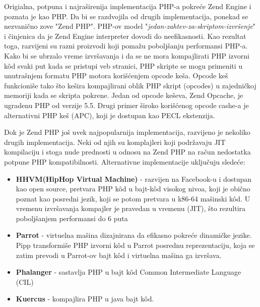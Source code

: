\documentclass[a4paper]{article}
\begin{document}
{Origialna, potpuna i najraširenija implementacija PHP-a pokreće Zend Engine i poznata je kao PHP. Da bi se razdvojila od drugih implementacija, ponekad se nezvanično zove "Zend PHP". PHP-ov model "\textit{jedan-zahtev-za-skriptom-izvršenje}" i činjenica da je Zend Engine interpreter dovodi do neefikasnosti. Kao rezultat toga, razvijeni su razni proizvodi koji pomažu poboljšanju performansi PHP-a. Kako bi se ubrzalo vreme izvršavanja i da se ne mora kompajlirati PHP izvorni k\^{o}d svaki put kada se pristupi veb stranici, PHP skripte se mogu primeniti u unutrašnjem formatu PHP motora korišćenjem opcode keša. Opcode keš funkcioniše tako što kešira kompajlirani oblik PHP skript (opcodes) u zajedničkoj memoriji kada se skripta pokrene. Jedan od opcode keševa, Zend Opcache\cite{zend}, je ugradenu PHP od verzije 5.5. Drugi primer široko korišćenog opcode cashe-a je alternativni PHP keš (APC)\cite{php}, koji je dostupan kao PECL ekstenzija.

Dok je Zend PHP još uvek najpopularnija implementacija, razvijeno je nekoliko drugih implementacija. Neki od njih su komplajleri koji podržavaju JIT\cite{jit} kompilaciju i stoga nude prednosti u odnosu na Zend PHP na račun nedostatka potpune PHP kompatibilnosti. Alternativne implementacije uključuju sledeće:
\begin{itemize}
\item \textbf{HHVM(HipHop Virtual Machine)}\cite{hhvm} - razvijen na Facebook-u i dostupan kao open source, pretvara PHP k\^{o}d  u bajt-k\^{o}d visokog nivoa, koji je obično poznat kao posredni jezik, koji se potom pretvara u k86-64 mašinski k\^{o}d. U vremenu izvršavanja kompajler je pravedan u vremenu (JIT), što rezultira poboljšanjem performansi do 6 puta
\item \textbf{Parrot}\cite{parrot} - virtuelna mašina dizajnirana da efikasno pokreće dinamičke jezike. Pipp transformiše PHP izvorni k\^{o}d u Parrot posrednu reprezentaciju, koja se zatim prevodi u Parrot-ov bajt k\^{o}d i virtuelna mašina ga izvršava.
\item \textbf{Phalanger} - sastavlja PHP u bajt k\^{o}d Common Intermediate Language (CIL)
\item \textbf{Kuercus} - kompajlira PHP u java bajt k\^{o}d.
\end{itemize}


}
\end{document}
